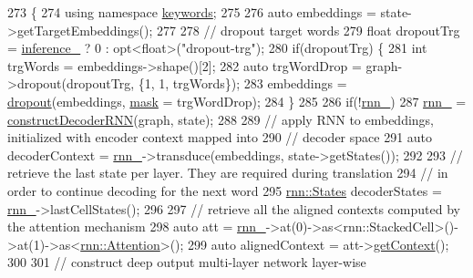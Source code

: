 \begin{DoxyCode}
273                                                           \{
274     \textcolor{keyword}{using namespace }\hyperlink{namespacekeywords}{keywords};
275 
276     \textcolor{keyword}{auto} embeddings = state->getTargetEmbeddings();
277 
278     \textcolor{comment}{// dropout target words}
279     \textcolor{keywordtype}{float} dropoutTrg = \hyperlink{classmarian_1_1DecoderBase_a808975d515f60a53096f6794c3dc61d4}{inference\_} ? 0 : opt<float>(\textcolor{stringliteral}{"dropout-trg"});
280     \textcolor{keywordflow}{if}(dropoutTrg) \{
281       \textcolor{keywordtype}{int} trgWords = embeddings->shape()[2];
282       \textcolor{keyword}{auto} trgWordDrop = graph->dropout(dropoutTrg, \{1, 1, trgWords\});
283       embeddings = \hyperlink{namespacemarian_a268400392f22176821c7c4a36733b178}{dropout}(embeddings, \hyperlink{namespacemarian_1_1keywords_a201bea6bea8108889b63081132cc3cd7}{mask} = trgWordDrop);
284     \}
285 
286     \textcolor{keywordflow}{if}(!\hyperlink{classmarian_1_1DecoderS2S_aa4292be54117f5fc7bee31fac549a93c}{rnn\_})
287       \hyperlink{classmarian_1_1DecoderS2S_aa4292be54117f5fc7bee31fac549a93c}{rnn\_} = \hyperlink{classmarian_1_1DecoderS2S_adad1c24cac6a5c5f2a679df18f3c0f58}{constructDecoderRNN}(graph, state);
288 
289     \textcolor{comment}{// apply RNN to embeddings, initialized with encoder context mapped into}
290     \textcolor{comment}{// decoder space}
291     \textcolor{keyword}{auto} decoderContext = \hyperlink{classmarian_1_1DecoderS2S_aa4292be54117f5fc7bee31fac549a93c}{rnn\_}->transduce(embeddings, state->getStates());
292 
293     \textcolor{comment}{// retrieve the last state per layer. They are required during translation}
294     \textcolor{comment}{// in order to continue decoding for the next word}
295     \hyperlink{namespaceamunmt_a4fe2912e208820f8217fbcf229ebacf7}{rnn::States} decoderStates = \hyperlink{classmarian_1_1DecoderS2S_aa4292be54117f5fc7bee31fac549a93c}{rnn\_}->lastCellStates();
296 
297     \textcolor{comment}{// retrieve all the aligned contexts computed by the attention mechanism}
298     \textcolor{keyword}{auto} att = \hyperlink{classmarian_1_1DecoderS2S_aa4292be54117f5fc7bee31fac549a93c}{rnn\_}->at(0)->as<rnn::StackedCell>()->at(1)->as<\hyperlink{namespacemarian_1_1rnn_ae9586d2236bd64dae0a644c58d9fc76e}{rnn::Attention}>();
299     \textcolor{keyword}{auto} alignedContext = att->\hyperlink{classmarian_1_1rnn_1_1GlobalAttention_ad518e4c82f56b8f95393dffa2df2288b}{getContext}();
300 
301     \textcolor{comment}{// construct deep output multi-layer network layer-wise}

\end{DoxyCode}
